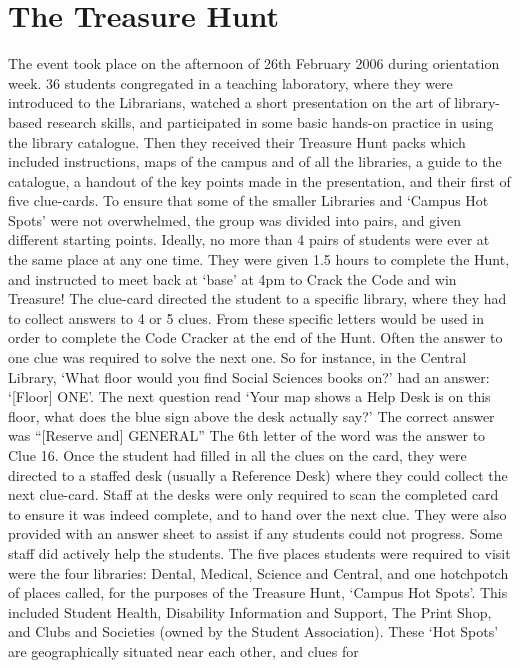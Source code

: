 \section{The Treasure Hunt}

The event took place on the afternoon of 26th February 2006 during orientation week. 36 
students congregated in a teaching laboratory, where they were introduced to the 
Librarians, watched a short presentation on the art of library-based research skills, and 
participated in some basic hands-on practice in using the library catalogue. Then they 
received their Treasure Hunt packs which included instructions, maps of the campus and 
of all the libraries, a guide to the catalogue, a handout of the key points made in the 
presentation, and their first of five clue-cards. To ensure that some of the smaller Libraries 
and ‘Campus Hot Spots’ were not overwhelmed, the group was divided into pairs, and 
given different starting points. Ideally, no more than 4 pairs of students were ever at the 
same place at any one time. They were given 1.5 hours to complete the Hunt, and 
instructed to meet back at ‘base’ at 4pm to Crack the Code and win Treasure! 
The clue-card directed the student to a specific library, where they had to collect answers 
to 4 or 5 clues. From these specific letters would be used in order to complete the Code 
Cracker at the end of the Hunt. Often the answer to one clue was required to solve the 
next one. So for instance, in the Central Library, ‘What floor would you find Social 
Sciences books on?’ had an answer: ‘[Floor] ONE’. The next question read ‘Your map 
shows a Help Desk is on this floor, what does the blue sign above the desk actually say?’ 
The correct answer was “[Reserve and] GENERAL” The 6th letter of the word was the 
answer to Clue 16. Once the student had filled in all the clues on the card, they were 
directed to a staffed desk (usually a Reference Desk) where they could collect the next 
clue-card. Staff at the desks were only required to scan the completed card to ensure it 
was indeed complete, and to hand over the next clue. They were also provided with an 
answer sheet to assist if any students could not progress. Some staff did actively help the 
students. 
The five places students were required to visit were the four libraries: Dental, Medical, 
Science and Central, and one hotchpotch of places called, for the purposes of the 
Treasure Hunt, ‘Campus Hot Spots’. This included Student Health, Disability Information 
and Support, The Print Shop, and Clubs and Societies (owned by the Student 
Association). These ‘Hot Spots’ are geographically situated near each other, and clues for
